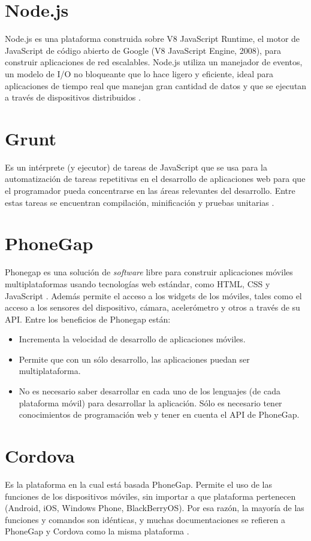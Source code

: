 \section{Node.js} \label{sect:Node}
Node.js es una plataforma construida sobre V8 JavaScript Runtime, el motor de JavaScript de código abierto de Google (V8 JavaScript Engine, 2008), para construir aplicaciones de red escalables. Node.js utiliza un manejador de eventos, un modelo de I/O no bloqueante que lo hace ligero y eficiente, ideal para aplicaciones de tiempo real que manejan gran cantidad de datos y que se ejecutan a través de dispositivos distribuidos \cite{NODE}. 

\section{Grunt} \label{sect:Grunt}
Es un intérprete (y ejecutor) de tareas de JavaScript que se usa para la automatización de tareas repetitivas en el desarrollo de aplicaciones web para que el programador pueda concentrarse en las áreas relevantes del desarrollo. Entre estas tareas se encuentran compilación, minificación y pruebas unitarias \cite{GRUNT}.

\section{PhoneGap} \label{sect:PhoneGap}
Phonegap es una solución de \textit{software} libre para construir aplicaciones móviles multiplataformas usando tecnologías web estándar, como HTML, CSS y JavaScript \cite{PHGAP}. Además permite el acceso a los widgets de los móviles, tales como el acceso a los sensores del dispositivo, cámara, acelerómetro y otros a través de su API. Entre los beneficios de Phonegap están:
\begin{itemize}[noitemsep,nolistsep]
\item Incrementa la velocidad de desarrollo de aplicaciones móviles. 
\item Permite que con un sólo desarrollo, las aplicaciones puedan ser multiplataforma.
\item No es necesario saber desarrollar en cada uno de los lenguajes (de cada plataforma móvil) para desarrollar la aplicación. Sólo es necesario tener conocimientos de programación web y tener en cuenta el API de PhoneGap.
\end{itemize}

\section{Cordova} \label{sect:Cordova}
Es la plataforma en la cual está basada PhoneGap. Permite el uso de las funciones de los dispositivos móviles, sin importar a que plataforma pertenecen (Android, iOS, Windows Phone, BlackBerryOS). Por esa razón, la mayoría de las funciones y comandos son idénticas, y muchas documentaciones se refieren a PhoneGap y Cordova como la misma plataforma \cite{CORDOVA}.

